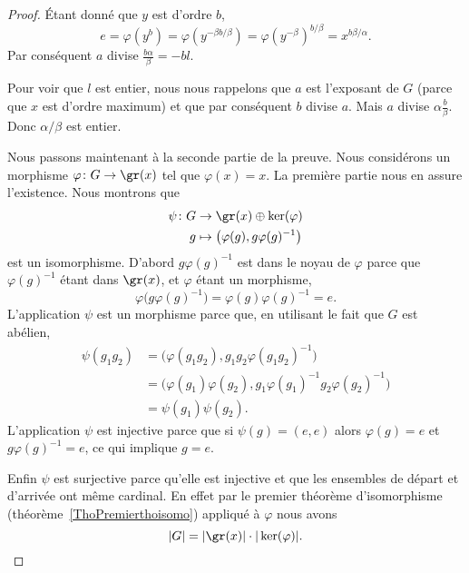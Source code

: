 \begin{proof}
    Étant donné que \( y\) est d'ordre \( b\),
    \begin{equation}
        e=\varphi(y^b)=\varphi(y^{-\beta b/\beta})=\varphi(y^{-\beta})^{b/\beta}=x^{b\beta/\alpha}.
    \end{equation}
    Par conséquent \( a\) divise \( \frac{ b\alpha }{ \beta }=-bl\).

    Pour voir que \( l\) est entier, nous nous rappelons que \( a\) est l'exposant de \( G\) (parce que \( x\) est d'ordre maximum) et que par conséquent \( b\) divise \( a\). Mais \( a\) divise \( \alpha\frac{ b }{ \beta }\). Donc \( \alpha/\beta\) est entier.

    Nous passons maintenant à la seconde partie de la preuve. Nous considérons un morphisme \( \varphi\colon G\to \gr(x)\) tel que \( \varphi(x)=x\). La première partie nous en assure l'existence. Nous montrons que
    \begin{equation}
        \begin{aligned}
            \psi\colon G&\to \gr(x)\oplus \ker(\varphi) \\
            g&\mapsto \big( \varphi(g),g\varphi(g)^{-1} \big)
        \end{aligned}
    \end{equation}
    est un isomorphisme. D'abord \( g\varphi(g)^{-1}\) est dans le noyau de \( \varphi\) parce que \( \varphi(g)^{-1}\) étant dans \( \gr(x)\), et \( \varphi\) étant un morphisme,
    \begin{equation}
        \varphi\big( g\varphi(g)^{-1} \big)=\varphi(g)\varphi(g)^{-1}=e.
    \end{equation}
    L'application \( \psi\) est un morphisme parce que, en utilisant le fait que \( G\) est abélien,
    \begin{subequations}
        \begin{align}
            \psi(g_1g_2)&=\big( \varphi(g_1g_2),g_1g_2\varphi(g_1g_2)^{-1} \big)\\
            &=\big( \varphi(g_1)\varphi(g_2),g_1\varphi(g_1)^{-1}g_2\varphi(g_2)^{-1} \big)\\
            &=\psi(g_1)\psi(g_2).
        \end{align}
    \end{subequations}
    L'application \( \psi\) est injective parce que si \( \psi(g)=(e,e)\) alors \( \varphi(g)=e\) et \( g\varphi(g)^{-1}=e\), ce qui implique \( g=e\).

    Enfin \( \psi\) est surjective parce qu'elle est injective et que les ensembles de départ et d'arrivée ont même cardinal. En effet par le premier théorème d'isomorphisme (théorème~\ref{ThoPremierthoisomo}) appliqué à \( \varphi\) nous avons
    \begin{equation}
        | G |=| \gr(x) |\cdot | \ker(\varphi) |.
    \end{equation}
\end{proof}

